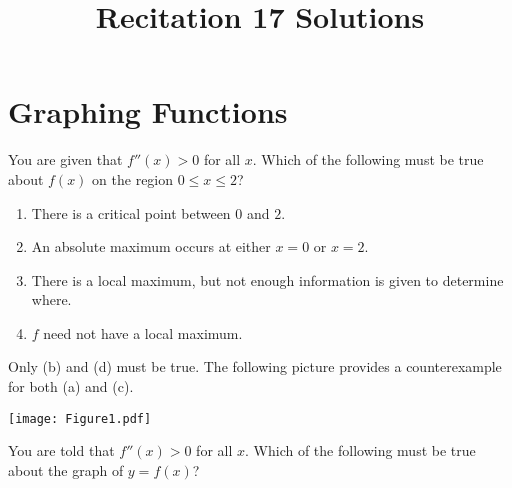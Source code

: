 \documentclass[nooutcomes]{ximera}
\title{Recitation 17 Solutions}
\renewenvironment{freeResponse}{
\ifhandout\setbox0\vbox\bgroup\else
\begin{trivlist}\item[\hskip \labelsep\bfseries Solution:\hspace{2ex}]
\fi}
{\ifhandout\egroup\else
\end{trivlist}
\fi}
\begin{document}
\begin{abstract}		\end{abstract}
\maketitle

\section{Graphing Functions}

\begin{problem}
  \mbox{}
  \begin{enumerate}
	
  \item[1.]  You are given that $f''(x) > 0$ for all $x$.  Which of
    the following must be true about $f(x)$ on the region
    $0 \leq x \leq 2$?
    \begin{enumerate}
		
    \item There is a critical point between $0$ and $2$.
    \item An absolute maximum occurs at either $x=0$ or $x=2$.
    \item There is a local maximum, but not enough information is
      given to determine where.
    \item $f$ need not have a local maximum.
		
    \end{enumerate}

			\begin{freeResponse}
                          Only (b) and (d) must be true.  The
                          following picture provides a counterexample
                          for both (a) and (c).
			
                          \begin{image}
                            \texttt{[image: Figure1.pdf]}
                          \end{image}
						
			\end{freeResponse}
		
		
		
                      \item[2.]  You are told that $f''(x) > 0$ for
                        all $x$.  Which of the following must be true
                        about the graph of $y=f(x)$?
                        \begin{enumerate}
		

\end{enumerate}
\end{enumerate}
\end{problem}
\end{document}
